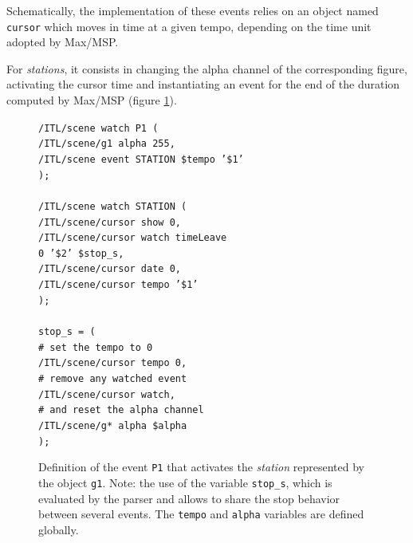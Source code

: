 \documentclass{article}
\newcommand{\OSC}[1]	{{\fontsize{9pt}{9pt} \selectfont\texttt{#1}}}
\newcommand{\tab}{\hspace*{4mm}}
\newcommand{\sample}[1]		{\vspace{-0.2em}\begin{center}\colorbox{mygrey}{\begin{minipage}[t]{0.98\columnwidth} {\small \texttt{#1}}\end{minipage}}\end{center}}
\begin{document}
Schematically, the implementation of these events relies on an object named \OSC{cursor} which moves in time at a given tempo, depending on the time unit adopted by Max/MSP.

For \emph{stations}, it consists in changing the alpha channel of the corresponding figure, activating the cursor time and instantiating an event for the end of the duration computed by Max/MSP (figure \ref{fig:station}).
\begin{figure}[h]
   \centering
\sample{/ITL/scene watch P1 ( \\
\tab/ITL/scene/g1 alpha 255, \\
\tab/ITL/scene event STATION \$tempo '\$1' \\
); \\
\\
/ITL/scene watch STATION ( \\
\tab/ITL/scene/cursor show 0,\\
\tab/ITL/scene/cursor watch timeLeave \\
\hspace*{30mm}0 '\$2' \$stop\_s,\\
\tab/ITL/scene/cursor date 0,\\
\tab/ITL/scene/cursor tempo '\$1'\\
); \\
\\
stop\_s = ( \\
\tab\# set the tempo to 0 \\
\tab/ITL/scene/cursor tempo 0, \\
\tab\# remove any watched event \\
\tab/ITL/scene/cursor watch,  \\
\tab\# and reset the alpha channel \\
\tab/ITL/scene/g* alpha \$alpha \\
);
}
   \caption{Definition of the event \OSC{P1} that activates the \emph{station} represented by the object \OSC{g1}. Note: the use of the variable \OSC{stop\_s}, which is evaluated by the parser and allows to share the stop behavior between several events. The \OSC{tempo} and \OSC{alpha} variables are defined globally.}
   \label{fig:station}
\end{figure}
\end{document}
